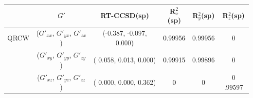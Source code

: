 \begin{table}
\begin{tabular}{c|c|c|ccc}
                 \hline
                                            &  $G'$ & \textrm{RT-CCSD(sp)} & R$^{2}_{x}$(sp) & R$^{2}_{y}$(sp)& R$^{2}_{z}$(sp)\\
                                          \hline
                \textrm{QRCW} & ($G'_{xx}$, $G'_{yx}$, $G'_{zx}$) & (-0.387, -0.097, 0.000) &   0.99956 & 0.99956 & 0 \\
                                          & ($G'_{xy}$, $G'_{yy}$, $G'_{zy}$) & ( 0.058,  0.013, 0.000) &   0.99915 & 0.99896 & 0 \\
                                          & ($G'_{xz}$, $G'_{yz}$, $G'_{zz}$) & ( 0.000,  0.000, 0.362) &   0 & 0  & 0 .99597\\  
                
   \end{tabular}
  \label{tab:g-ccsd}
\end{table}
